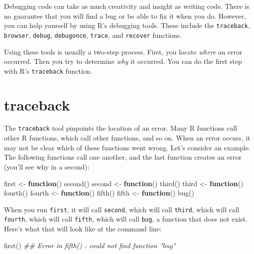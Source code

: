 \documentclass[
  letterpaper,
  DIV=11,
  numbers=noendperiod]{scrbook}
\newenvironment{Shaded}{\begin{snugshade}}{\end{snugshade}}
\newcommand{\ControlFlowTok}[1]{\textcolor[rgb]{0.00,0.23,0.31}{\textbf{#1}}}
\newcommand{\DocumentationTok}[1]{\textcolor[rgb]{0.37,0.37,0.37}{\textit{#1}}}
\newcommand{\FunctionTok}[1]{\textcolor[rgb]{0.28,0.35,0.67}{#1}}
\newcommand{\NormalTok}[1]{\textcolor[rgb]{0.00,0.23,0.31}{#1}}
\newcommand{\OtherTok}[1]{\textcolor[rgb]{0.00,0.23,0.31}{#1}}
\begin{document}
Debugging code can take as much creativity and insight as writing code.
There is no guarantee that you will find a bug or be able to fix it when
you do. However, you can help yourself by using R's debugging tools.
These include the \texttt{traceback}, \texttt{browser}, \texttt{debug},
\texttt{debugonce}, \texttt{trace}, and \texttt{recover} functions.

Using these tools is usually a two-step process. First, you locate
\emph{where} an error occurred. Then you try to determine \emph{why} it
occurred. You can do the first step with R's \texttt{traceback}
function.

\section{traceback}\label{traceback}

The \texttt{traceback} tool pinpoints the location of an error. Many R
functions call other R functions, which call other functions, and so on.
When an error occurs, it may not be clear which of these functions went
wrong. Let's consider an example. The following functions call one
another, and the last function creates an error (you'll see why in a
second):

\begin{Shaded}
\begin{Highlighting}[]
\NormalTok{first }\OtherTok{\textless{}{-}} \ControlFlowTok{function}\NormalTok{() }\FunctionTok{second}\NormalTok{()}
\NormalTok{second }\OtherTok{\textless{}{-}} \ControlFlowTok{function}\NormalTok{() }\FunctionTok{third}\NormalTok{()}
\NormalTok{third }\OtherTok{\textless{}{-}} \ControlFlowTok{function}\NormalTok{() }\FunctionTok{fourth}\NormalTok{()}
\NormalTok{fourth }\OtherTok{\textless{}{-}} \ControlFlowTok{function}\NormalTok{() }\FunctionTok{fifth}\NormalTok{()}
\NormalTok{fifth }\OtherTok{\textless{}{-}} \ControlFlowTok{function}\NormalTok{() }\FunctionTok{bug}\NormalTok{()}
\end{Highlighting}
\end{Shaded}

When you run \texttt{first}, it will call \texttt{second}, which will
call \texttt{third}, which will call \texttt{fourth}, which will call
\texttt{fifth}, which will call \texttt{bug}, a function that does not
exist. Here's what that will look like at the command line:

\begin{Shaded}
\begin{Highlighting}[]
\FunctionTok{first}\NormalTok{()}
\DocumentationTok{\#\#  Error in fifth() : could not find function "bug" }
\end{Highlighting}
\end{Shaded}
\end{document}
